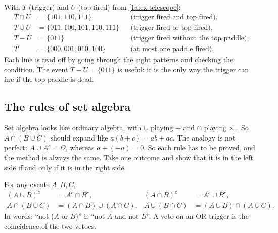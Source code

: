 \label{1a:ex:telescope-ops}
With $T$ (trigger) and $U$ (top fired) from \cref{1a:ex:telescope}:
\begin{align*}
T\cap U &= \{101,110,111\} &&\text{(trigger fired and top fired)},\\
T\cup U &= \{011,100,101,110,111\} &&\text{(trigger fired or top fired)},\\
T-U &= \{011\} &&\text{(trigger fired without the top paddle)},\\
T^c &= \{000,001,010,100\} &&\text{(at most one paddle fired)}.
\end{align*}
Each line is read off by going through the eight patterns and checking the
condition. The event $T-U=\{011\}$ is useful: it is the only way the trigger
can fire if the top paddle is dead.

\subsection{The rules of set algebra}

Set algebra looks like ordinary algebra, with $\cup$ playing $+$ and $\cap$
playing $\times$ . So $A\cap(B\cup C)$ should
expand like $a(b+c)=ab+ac$. The analogy is not perfect: $A\cup A^c=\Omega$,
whereas $a+(-a)=0$. So each rule has to be proved, and the method is always the
same. Take one outcome and show that it is in the left side if and only if it
is in the right side.

\begin{keyidea}
For any events $A,B,C$,
\begin{align}
(A\cup B)^c &= A^c\cap B^c, & (A\cap B)^c &= A^c\cup B^c, \label{1a:eq:demorgan}\\
A\cap(B\cup C) &= (A\cap B)\cup(A\cap C), & A\cup(B\cap C) &= (A\cup B)\cap(A\cup C).
\label{1a:eq:distrib}
\end{align}
In words: ``not ($A$ or $B$)'' is ``not $A$ and not $B$''. A veto on an OR
trigger is the coincidence of the two vetoes.
\end{keyidea}

